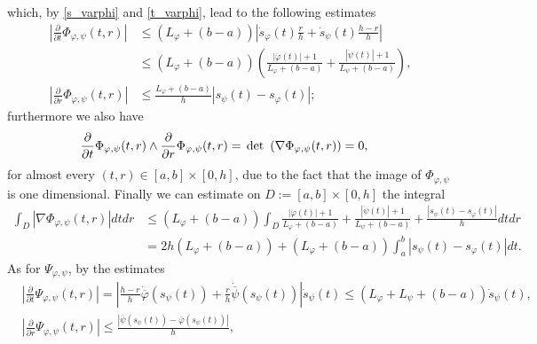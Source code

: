 \documentclass[a4paper,11pt]{article}
\numberwithin{equation}{section}
\def\det{\,{\rm det\ }}
\begin{document}
which, by \eqref{s_varphi} and \eqref{t_varphi}, lead to the following estimates
\begin{align*}
\left|\frac{\partial }{\partial t}\Phi_{\varphi,\psi}(t,r)\right|&\leq (L_\varphi+(b-a))\left|\dot s_\varphi(t)\frac{r}{h}+\dot s_\psi(t)\frac{h-r}{h}\right|\\
&\leq (L_\varphi+(b-a))\left(\frac{|\dot \varphi(t)|+1}{L_\varphi+(b-a)}+\frac{|\dot \psi(t)|+1}{L_\psi+(b-a)}\right),\\
\left|\frac{\partial }{\partial r}\Phi_{\varphi,\psi}(t,r)\right|&\leq\frac{L_\varphi+(b-a)}{h}{|s_\psi(t)-s_\varphi(t)|};
\end{align*}
furthermore we also have
\begin{align}\label{stimadetPhi}
	&\frac{\partial }{\partial t}\Phi_{\varphi,\psi}(t,r)\wedge 	\frac{\partial }{\partial r}\Phi_{\varphi,\psi}(t,r)=\det\left(\nabla \Phi_{\varphi,\psi}(t,r) \right)=0,
\end{align}
for almost every $(t,r)\in [a,b]\times [0,h]$, due to the fact that the image of $\Phi_{\varphi,\psi}$ is one dimensional.
Finally we can estimate on $D:=[a,b]\times [0,h]$ the integral
\begin{align}\label{stimanablaPhi}
\int_D|\nabla \Phi_{\varphi,\psi}(t,r)|dtdr&\leq (L_\varphi+(b-a)) \int_D\frac{|\dot \varphi(t)|+1}{L_\varphi+(b-a)}+\frac{|\dot \psi(t)|+1}{L_\psi+(b-a)}+\frac{|s_\psi(t)-s_\varphi(t)|}{h}dtdr\nonumber\\
&= 2h(L_\varphi+(b-a))+(L_\varphi+(b-a))\int_a^b|s_\psi(t)-s_\varphi(t)|dt.
\end{align}
As for $\Psi_{\varphi,\psi}$, by the estimates
\begin{align*}
	&\left|	\frac{\partial }{\partial t}\Psi_{\varphi,\psi}(t,r)\right|= \left|\frac{h-r}{h}\dot{\overline \varphi}(s_\psi(t))+\frac{r}{h}\dot{\overline \psi}(s_\psi(t))\right|\dot s_\psi(t)\leq (L_\varphi+L_\psi+(b-a))\dot s_\psi(t),\\
	&\left|	\frac{\partial }{\partial r}\Psi_{\varphi,\psi}(t,r)\right|\leq \frac{|{\overline \psi}(s_\psi(t))-{\overline \varphi}(s_\psi(t))|}{h},
\end{align*}
\end{document}

